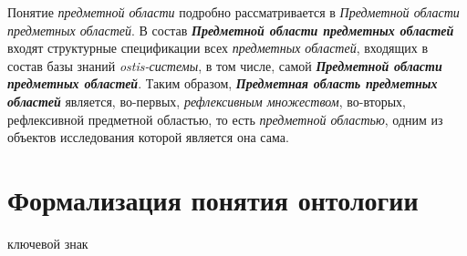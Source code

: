 Понятие \textit{предметной области} подробно рассматривается в \textit{Предметной области предметных областей}. В состав \textbf{\textit{Предметной области предметных областей}} входят структурные спецификации всех \textit{предметных областей}, входящих в состав базы знаний \textit{ostis-системы}, в том числе, самой \textbf{\textit{Предметной области предметных областей}}. Таким образом, \textbf{\textit{Предметная область предметных областей}} является, во-первых, \textit{рефлексивным множеством}, во-вторых, рефлексивной предметной областью, то есть \textit{предметной областью}, одним из объектов исследования которой является она сама.

\section{Формализация понятия онтологии}
\label{sec_ontology}

\begin{SCn}
	\begin{scnrelfromlist}{ключевой знак}
	\end{scnrelfromlist}
\end{SCn}

